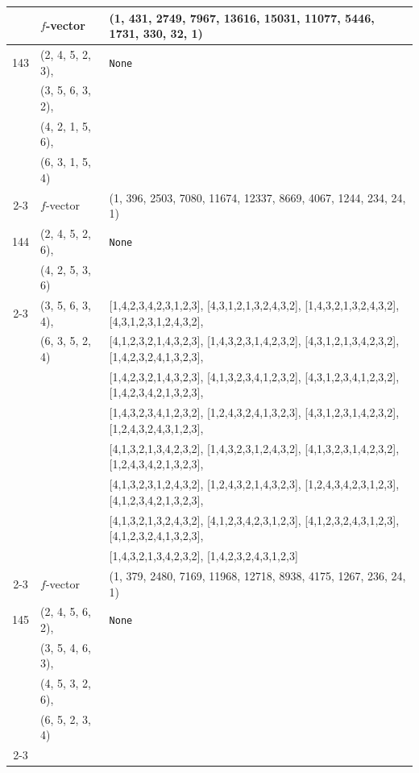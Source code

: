 \documentclass[10pt]{amsart}
\numberwithin{equation}{section}
\theoremstyle{plain}
\theoremstyle{definition}
\theoremstyle{remark}
\begin{document}
{\begin{longtable}{c|l|l}
		& $f$-vector & {(1, 431, 2749, 7967, 13616, 15031, 11077, 5446, 1731, 330, 32, 1)} \\
		\midrule
		
		143 & (2, 4, 5, 2, 3), & \texttt{None} \\
		& (3, 5, 6, 3, 2), &  \\
		& (4, 2, 1, 5, 6), &  \\
		& (6, 3, 1, 5, 4) &  \\ \cline{2-3}
		
		& $f$-vector & {(1, 396, 2503, 7080, 11674, 12337, 8669, 4067, 1244, 234, 24, 1)} \\
		\midrule
		
		144 & (2, 4, 5, 2, 6), & \texttt{None} \\
		& (4, 2, 5, 3, 6) &  \\ \cline{2-3}
		
		& (3, 5, 6, 3, 4), & [1,4,2,3,4,2,3,1,2,3], [4,3,1,2,1,3,2,4,3,2], [1,4,3,2,1,3,2,4,3,2], [4,3,1,2,3,1,2,4,3,2], \\
		& (6, 3, 5, 2, 4) & [4,1,2,3,2,1,4,3,2,3], [1,4,3,2,3,1,4,2,3,2], [4,3,1,2,1,3,4,2,3,2], [1,4,2,3,2,4,1,3,2,3], \\
		&  & [1,4,2,3,2,1,4,3,2,3], [4,1,3,2,3,4,1,2,3,2], [4,3,1,2,3,4,1,2,3,2], [1,4,2,3,4,2,1,3,2,3], \\
		&  & [1,4,3,2,3,4,1,2,3,2], [1,2,4,3,2,4,1,3,2,3], [4,3,1,2,3,1,4,2,3,2], [1,2,4,3,2,4,3,1,2,3], \\
		&  & [4,1,3,2,1,3,4,2,3,2], [1,4,3,2,3,1,2,4,3,2], [4,1,3,2,3,1,4,2,3,2], [1,2,4,3,4,2,1,3,2,3], \\
		&  & [4,1,3,2,3,1,2,4,3,2], [1,2,4,3,2,1,4,3,2,3], [1,2,4,3,4,2,3,1,2,3], [4,1,2,3,4,2,1,3,2,3], \\
		&  & [4,1,3,2,1,3,2,4,3,2], [4,1,2,3,4,2,3,1,2,3], [4,1,2,3,2,4,3,1,2,3], [4,1,2,3,2,4,1,3,2,3], \\
		&  & [1,4,3,2,1,3,4,2,3,2], [1,4,2,3,2,4,3,1,2,3] \\ \cline{2-3}
		
		& $f$-vector & {(1, 379, 2480, 7169, 11968, 12718, 8938, 4175, 1267, 236, 24, 1)} \\
		\midrule
		
		145 & (2, 4, 5, 6, 2), & \texttt{None} \\
		& (3, 5, 4, 6, 3), &  \\
		& (4, 5, 3, 2, 6), &  \\
		& (6, 5, 2, 3, 4) &  \\ \cline{2-3}
		

\end{longtable}}
\end{document}
